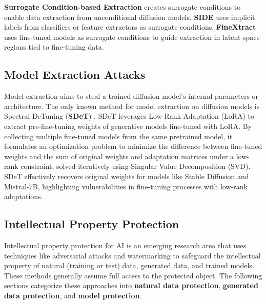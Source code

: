 \textbf{Surrogate Condition-based Extraction} creates surrogate conditions to enable data extraction from unconditional diffusion models. \textbf{SIDE} \cite{chen2024towards} uses implicit labels from classifiers or feature extractors as surrogate conditions. \textbf{FineXtract} \cite{wu2024revealing} uses fine-tuned models as surrogate conditions to guide extraction in latent space regions tied to fine-tuning data.


\subsection{Model Extraction Attacks}
\label{sec:dm_model_extraction_attacks}

Model extraction aims to steal a trained diffusion model's internal parameters or architecture. The only known method for model extraction on diffusion models is Spectral DeTuning (\textbf{SDeT})  \cite{horwitz2024recovering}.
SDeT leverages Low-Rank Adaptation (LoRA) \cite{hu2021lora} to extract pre-fine-tuning weights of generative models fine-tuned with LoRA. By collecting multiple fine-tuned models from the same pretrained model, it formulates an optimization problem to minimize the difference between fine-tuned weights and the sum of original weights and adaptation matrices under a low-rank constraint, solved iteratively using Singular Value Decomposition (SVD)\cite{stewart1993early}. SDeT effectively recovers original weights for models like Stable Diffusion and Mistral-7B\cite{jiang2023mistral}, highlighting vulnerabilities in fine-tuning processes with low-rank adaptations.

\subsection{Intellectual Property Protection}
\label{sec:dm_intellectual_property_protection}

Intellectual property protection for AI is an emerging research area that uses techniques like adversarial attacks and watermarking to safeguard the intellectual property of natural (training or test) data, generated data, and trained models. These methods generally assume full access to the protected object. The following sections categorize these approaches into \textbf{natural data protection}, \textbf{generated data protection}, and \textbf{model protection}.

